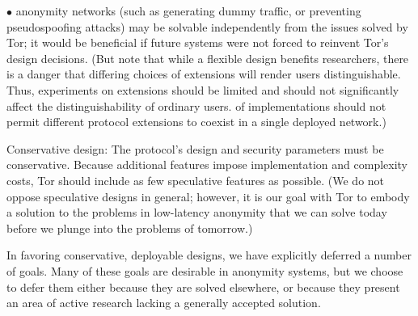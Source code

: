 \documentclass[times,10pt,twocolumn]{article}
\newenvironment{tightlist}{\begin{list}{$\bullet$}{
  \setlength{\itemsep}{0mm}
    \setlength{\parsep}{0mm}
    }}{\end{list}}
\begin{document}
\begin{tightlist}
  anonymity networks (such as generating dummy traffic, or preventing
  pseudospoofing attacks) may be solvable independently from the issues
  solved by Tor; it would be beneficial if future systems were not forced to
  reinvent Tor's design decisions.  (But note that while a flexible design
  benefits researchers, there is a danger that differing choices of
  extensions will render users distinguishable.  Thus, experiments
  on extensions should be limited and should not significantly affect
  the distinguishability of ordinary users.
  of implementations should
  not permit different protocol extensions to coexist in a single deployed
  network.)
\item[Conservative design:] The protocol's design and security parameters
  must be conservative.  Because additional features impose implementation
  and complexity costs, Tor should include as few speculative features as
  possible.  (We do not oppose speculative designs in general; however, it is
  our goal with Tor to embody a solution to the problems in low-latency
  anonymity that we can solve today before we plunge into the problems of
  tomorrow.)
\end{tightlist}

\label{subsec:non-goals}
In favoring conservative, deployable designs, we have explicitly deferred
a number of goals. Many of these goals are desirable in anonymity systems,
but we choose to defer them either because they are solved elsewhere,
or because they present an area of active research lacking a generally
accepted solution.
\end{document}
